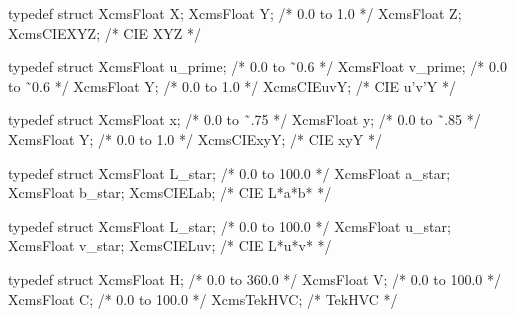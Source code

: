 \documentclass{report}
\begin{document}
\begin{itemize}
\begin{cppcode}
                typedef struct {
                    XcmsFloat X;
                    XcmsFloat Y; /* 0.0 to 1.0 */
                    XcmsFloat Z;
                } XcmsCIEXYZ; /* CIE XYZ */

                typedef struct {
                    XcmsFloat u_prime; /* 0.0 to ˜0.6 */
                    XcmsFloat v_prime; /* 0.0 to ˜0.6 */
                    XcmsFloat Y; /* 0.0 to 1.0 */
                } XcmsCIEuvY; /* CIE u’v’Y */
            \end{cppcode}
            \begin{cppcode}
                typedef struct {
                    XcmsFloat x; /* 0.0 to ˜.75 */
                    XcmsFloat y; /* 0.0 to ˜.85 */
                    XcmsFloat Y; /* 0.0 to 1.0 */
                } XcmsCIExyY; /* CIE xyY */

                typedef struct {
                    XcmsFloat L_star; /* 0.0 to 100.0 */
                    XcmsFloat a_star;
                    XcmsFloat b_star;
                } XcmsCIELab; /* CIE L*a*b* */

                typedef struct {
                    XcmsFloat L_star; /* 0.0 to 100.0 */
                    XcmsFloat u_star;
                    XcmsFloat v_star;
                } XcmsCIELuv; /* CIE L*u*v* */

                typedef struct {
                    XcmsFloat H; /* 0.0 to 360.0 */
                    XcmsFloat V; /* 0.0 to 100.0 */
                    XcmsFloat C; /* 0.0 to 100.0 */
                } XcmsTekHVC; /* TekHVC */


\end{cppcode}
\end{itemize}
\end{document}
